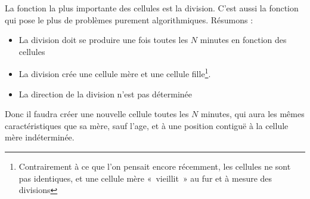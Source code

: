 La fonction la plus importante des cellules est la division. C'est aussi la fonction qui pose le plus de problèmes purement algorithmiques. Résumons :
\begin{itemize}
  \item La division doit se produire une fois toutes les $N$ minutes en fonction des cellules
  \item La division crée une cellule mère et une cellule fille\footnote{Contrairement à ce que l'on pensait encore récemment, les cellules ne sont pas identiques, et une cellule mère «~vieillit~» au fur et à mesure des divisions}.
  \item La direction de la division n'est pas déterminée
\end{itemize}

  Donc il faudra créer une nouvelle cellule toutes les $N$ minutes, qui aura les mêmes caractéristiques que sa mère, sauf l'age, et à une position contiguë à la cellule mère indéterminée.
  
